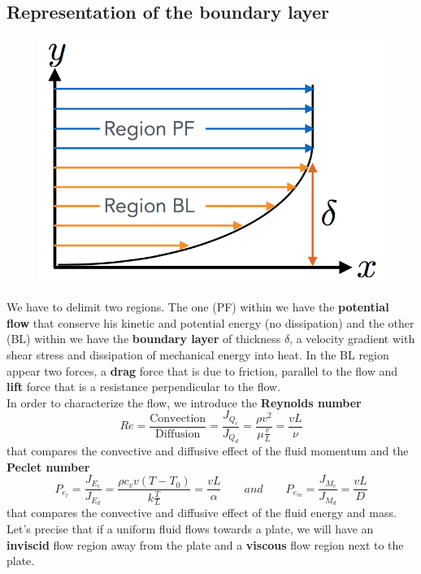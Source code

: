 	\newpage
	
\subsection{Representation of the boundary layer}
	\begin{figure}
	\vspace{-5mm}
	\includegraphics[scale=0.3]{ch1/11}
	\end{figure}
	We have to delimit two regions. The one (PF) within we have the \textbf{potential flow} that conserve his kinetic and potential energy (no dissipation) and the other (BL) within we have the \textbf{boundary layer} of thickness $\delta$, a velocity gradient with shear stress and dissipation of mechanical energy into heat. In the BL region appear two forces, a \textbf{drag} force that is due to friction, parallel to the flow and \textbf{lift} force that is a resistance perpendicular to the flow.  \\
	In order to characterize the flow, we introduce the \textbf{Reynolds number}\\
	\begin{equation}
		Re = \frac{\mbox{Convection}}{\mbox{Diffusion}} = \frac{J_{Q_c}}{J_{Q_d}} = \frac{\rho v^2}{\mu \frac{v}{L}} = \frac{vL}{\nu}
	\end{equation}
	that compares the convective and diffusive effect of the fluid momentum and the \textbf{Peclet number}
	\begin{equation}
		P_{e_t} = \frac{J_{E_c}}{J_{E_d}} = \frac{\rho c_v v (T- T_0)}{k\frac{T}{L}} = \frac{vL}{\alpha} 
		\qquad and \qquad 
		P_{e_m} = \frac{J_{M_c}}{J_{M_d}} = \frac{vL}{D} 	
	\end{equation}
	that compares the convective and diffusive effect of the fluid energy and mass. Let's precise that if a uniform fluid flows towards a plate, we will have an \textbf{inviscid} flow region away from the plate and a \textbf{viscous} flow region next to the plate.
	
